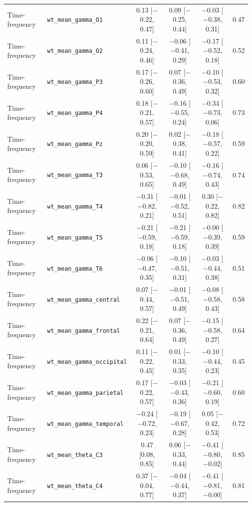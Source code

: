 {\begin{longtable}{llcccc}
Time-frequency & \texttt{wt\_mean\_gamma\_O1} & 0.13 [$-$0.22, 0.47] & 0.09 [$-$0.25, 0.44] & $-$0.03 [$-$0.38, 0.31] & 0.47 \\
Time-frequency & \texttt{wt\_mean\_gamma\_O2} & 0.11 [$-$0.24, 0.46] & $-$0.06 [$-$0.41, 0.29] & $-$0.17 [$-$0.52, 0.18] & 0.52 \\
Time-frequency & \texttt{wt\_mean\_gamma\_P3} & 0.17 [$-$0.26, 0.60] & 0.07 [$-$0.36, 0.49] & $-$0.10 [$-$0.53, 0.32] & 0.60 \\
Time-frequency & \texttt{wt\_mean\_gamma\_P4} & 0.18 [$-$0.21, 0.57] & $-$0.16 [$-$0.55, 0.24] & $-$0.34 [$-$0.73, 0.06] & 0.73 \\
Time-frequency & \texttt{wt\_mean\_gamma\_Pz} & 0.20 [$-$0.20, 0.59] & 0.02 [$-$0.38, 0.41] & $-$0.18 [$-$0.57, 0.22] & 0.59 \\
Time-frequency & \texttt{wt\_mean\_gamma\_T3} & 0.06 [$-$0.53, 0.65] & $-$0.10 [$-$0.68, 0.49] & $-$0.16 [$-$0.74, 0.43] & 0.74 \\
Time-frequency & \texttt{wt\_mean\_gamma\_T4} & $-$0.31 [$-$0.82, 0.21] & $-$0.01 [$-$0.52, 0.51] & 0.30 [$-$0.22, 0.82] & 0.82 \\
Time-frequency & \texttt{wt\_mean\_gamma\_T5} & $-$0.21 [$-$0.59, 0.18] & $-$0.21 [$-$0.59, 0.18] & $-$0.00 [$-$0.39, 0.39] & 0.59 \\
Time-frequency & \texttt{wt\_mean\_gamma\_T6} & $-$0.06 [$-$0.47, 0.35] & $-$0.10 [$-$0.51, 0.31] & $-$0.03 [$-$0.44, 0.38] & 0.51 \\
Time-frequency & \texttt{wt\_mean\_gamma\_central} & 0.07 [$-$0.44, 0.57] & $-$0.01 [$-$0.51, 0.49] & $-$0.08 [$-$0.58, 0.43] & 0.58 \\
Time-frequency & \texttt{wt\_mean\_gamma\_frontal} & 0.22 [$-$0.21, 0.64] & 0.07 [$-$0.36, 0.49] & $-$0.15 [$-$0.58, 0.27] & 0.64 \\
Time-frequency & \texttt{wt\_mean\_gamma\_occipital} & 0.11 [$-$0.22, 0.45] & 0.01 [$-$0.33, 0.35] & $-$0.10 [$-$0.44, 0.23] & 0.45 \\
Time-frequency & \texttt{wt\_mean\_gamma\_parietal} & 0.17 [$-$0.22, 0.57] & $-$0.03 [$-$0.43, 0.36] & $-$0.21 [$-$0.60, 0.19] & 0.60 \\
Time-frequency & \texttt{wt\_mean\_gamma\_temporal} & $-$0.24 [$-$0.72, 0.23] & $-$0.19 [$-$0.67, 0.28] & 0.05 [$-$0.42, 0.53] & 0.72 \\
Time-frequency & \texttt{wt\_mean\_theta\_C3} & 0.47 [0.08, 0.85] & 0.06 [$-$0.33, 0.44] & $-$0.41 [$-$0.80, $-$0.02] & 0.85 \\
Time-frequency & \texttt{wt\_mean\_theta\_C4} & 0.37 [$-$0.04, 0.77] & $-$0.04 [$-$0.44, 0.37] & $-$0.41 [$-$0.81, $-$0.00] & 0.81 \\

\end{longtable}}
